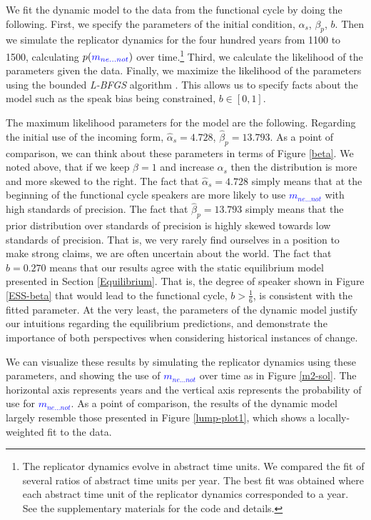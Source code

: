 \documentclass[linguex]{sp}
\theoremstyle{definition} \newtheorem{definition}{Definition}
\begin{document}
We fit the dynamic model to the data from the functional cycle by doing the following. First, we  specify the parameters of the initial condition, $\alpha_{s}$, $\beta_p$, $b$. Then we  simulate the replicator dynamics for the four hundred years from 1100 to 1500, calculating $p(\textcolor{blue}{m_{ne...not}})$ over time.\footnote{The replicator dynamics evolve in abstract time units. We compared the fit of several ratios of abstract time units per year. The best fit was obtained where each abstract time unit of the replicator dynamics corresponded to a year. See the supplementary materials for the code and details.} Third, we calculate the likelihood of the parameters given the data. Finally, we maximize the likelihood of the parameters using the bounded \emph{L-BFGS} algorithm \citep{byrd1995}. This allows us to specify facts about the model such as the speak bias being constrained,  $b \in [0,1]$.


The maximum likelihood parameters for the model are the following.  Regarding the initial use of the incoming form, $\hat{\alpha}_{s} = 4.728$, $\hat{\beta}_p =  13.793$. As a point of comparison, we can think about these parameters in terms of Figure \ref{beta}. We noted above, that if we keep $\beta=1$ and increase $\alpha_s$ then the distribution is more and more skewed to the right. The fact that $\hat{\alpha}_{s} = 4.728$ simply means that at the beginning of the functional cycle speakers are more likely to use \textcolor{blue}{$m_{ne...not}$} with high standards of precision. The fact that $\hat{\beta}_p =  13.793$ simply means that the prior distribution over standards of precision is highly skewed towards low standards of precision. That is, we very rarely find ourselves in a position to make strong claims, we are often uncertain about the world. The fact that $\hat{b}=0.270$ means that our results agree with the static equilibrium model presented in Section \ref{Equilibrium}. That is, the degree of speaker shown in Figure \ref{ESS-beta} that would lead to the functional cycle, $b > \frac{1}{6}$, is consistent with the fitted parameter. At the very least, the parameters of the dynamic model justify our intuitions regarding the equilibrium predictions, and demonstrate the importance of both perspectives when considering historical instances of change.

We can visualize these results by simulating the replicator dynamics using these parameters, and showing the use of \textcolor{blue}{$m_{ne...not}$} over time as in Figure \ref{m2-sol}. The horizontal axis represents years and the vertical axis represents the probability of use for \textcolor{blue}{$m_{ne...not}$}.  As a point of comparison, the results of the dynamic model largely resemble those presented in Figure \ref{lump-plot1}, which shows a locally-weighted fit to the data.
\end{document}
